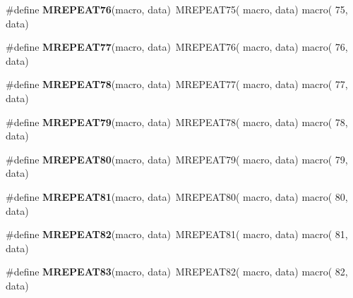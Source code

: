 \begin{DoxyCompactItemize}
\item 
\hypertarget{group__group__sam0__utils__mrepeat_ga58c5f129a638f3cad65063a67dbdcbb6}{}\#define {\bfseries M\+R\+E\+P\+E\+A\+T76}(macro,  data)~M\+R\+E\+P\+E\+A\+T75( macro, data)   macro( 75, data)\label{group__group__sam0__utils__mrepeat_ga58c5f129a638f3cad65063a67dbdcbb6}

\item 
\hypertarget{group__group__sam0__utils__mrepeat_ga1831e4c1682945001b9b5fc06dedc788}{}\#define {\bfseries M\+R\+E\+P\+E\+A\+T77}(macro,  data)~M\+R\+E\+P\+E\+A\+T76( macro, data)   macro( 76, data)\label{group__group__sam0__utils__mrepeat_ga1831e4c1682945001b9b5fc06dedc788}

\item 
\hypertarget{group__group__sam0__utils__mrepeat_ga970169b9fc014f633cefa289e7acc5f7}{}\#define {\bfseries M\+R\+E\+P\+E\+A\+T78}(macro,  data)~M\+R\+E\+P\+E\+A\+T77( macro, data)   macro( 77, data)\label{group__group__sam0__utils__mrepeat_ga970169b9fc014f633cefa289e7acc5f7}

\item 
\hypertarget{group__group__sam0__utils__mrepeat_ga8ca389624ac706853a8b95daa9b60074}{}\#define {\bfseries M\+R\+E\+P\+E\+A\+T79}(macro,  data)~M\+R\+E\+P\+E\+A\+T78( macro, data)   macro( 78, data)\label{group__group__sam0__utils__mrepeat_ga8ca389624ac706853a8b95daa9b60074}

\item 
\hypertarget{group__group__sam0__utils__mrepeat_ga4e1ab69f4a649fc9f759f19ddf0150bd}{}\#define {\bfseries M\+R\+E\+P\+E\+A\+T80}(macro,  data)~M\+R\+E\+P\+E\+A\+T79( macro, data)   macro( 79, data)\label{group__group__sam0__utils__mrepeat_ga4e1ab69f4a649fc9f759f19ddf0150bd}

\item 
\hypertarget{group__group__sam0__utils__mrepeat_ga20dda5110c7ee8595742b7493a50fa84}{}\#define {\bfseries M\+R\+E\+P\+E\+A\+T81}(macro,  data)~M\+R\+E\+P\+E\+A\+T80( macro, data)   macro( 80, data)\label{group__group__sam0__utils__mrepeat_ga20dda5110c7ee8595742b7493a50fa84}

\item 
\hypertarget{group__group__sam0__utils__mrepeat_gab614d1a44b41de1264618e26d1f457c6}{}\#define {\bfseries M\+R\+E\+P\+E\+A\+T82}(macro,  data)~M\+R\+E\+P\+E\+A\+T81( macro, data)   macro( 81, data)\label{group__group__sam0__utils__mrepeat_gab614d1a44b41de1264618e26d1f457c6}

\item 
\hypertarget{group__group__sam0__utils__mrepeat_ga05a5bfb2999f879cbf95768b7cc98d8f}{}\#define {\bfseries M\+R\+E\+P\+E\+A\+T83}(macro,  data)~M\+R\+E\+P\+E\+A\+T82( macro, data)   macro( 82, data)\label{group__group__sam0__utils__mrepeat_ga05a5bfb2999f879cbf95768b7cc98d8f}


\end{DoxyCompactItemize}
